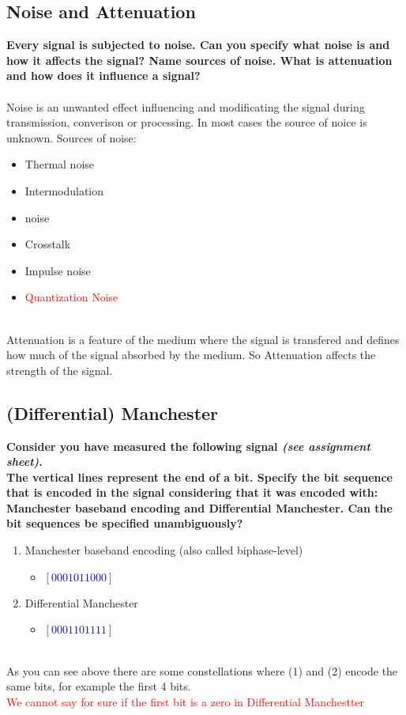 \documentclass[a4paper,12pt]{article}
\begin{document}
\subsection{Noise and Attenuation}
\textbf{Every signal is subjected to noise.  Can you specify what noise is and how it affects the signal? Name sources of noise.  What is attenuation and how does it influence a signal?}\\
\\
Noise is an unwanted effect influencing and modificating the signal during transmission, converison or processing. In most cases the source of noice is unknown. Sources of noise:
\begin{itemize}[itemsep=0pt]
	\item Thermal noise
	\item Intermodulation
	\item noise
	\item Crosstalk
	\item Impulse noise
    \item \textcolor{red}{Quantization Noise}
\end{itemize}
\\
Attenuation is a feature of the medium where the signal is transfered and defines how much of the signal absorbed by the medium. So Attenuation affects the strength of the signal.

\pagebreak
\subsection{(Differential) Manchester}
\textbf{Consider you have measured the following signal \textit{(see assignment sheet)}.\\
The vertical lines represent the end of a bit.  Specify the bit sequence that is encoded in the signal considering that it was encoded with: Manchester baseband encoding and Differential Manchester. Can the bit sequences be specified unambiguously?}

\begin{enumerate}[itemsep=0pt]
	\item Manchester baseband encoding (also called biphase-level)
	\begin{itemize}
		\item \textcolor{blue}{$[0001011000]$}
	\end{itemize}
	\item Differential Manchester
	\begin{itemize}
		\item \textcolor{blue}{$[0001101111]$}
	\end{itemize}
\end{enumerate}
\\
As you can see above there are some constellations where (1) and (2) encode the same bits, for example the first 4 bits.
\\
\textcolor{red}{We cannot say for sure if the first bit is a zero in Differential Manchestter}
	
\end{document}
